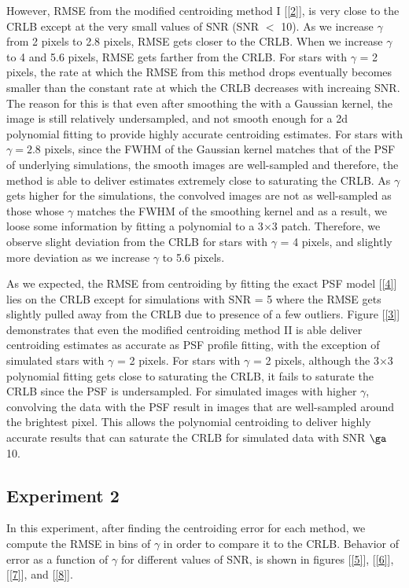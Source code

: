 \documentclass[12pt, preprint]{aastex}
\begin{document}
However, RMSE from the modified centroiding method I [\ref{2}],
is very close to the CRLB except at the very small values of SNR (SNR $<$ 10).
As we increase $\gamma$ from 2 pixels to 2.8 pixels, RMSE gets closer
to the CRLB. When we increase $\gamma$ to
4 and 5.6 pixels, RMSE gets farther from the CRLB. For stars with $\gamma$ = 2 pixels, 
the rate at which the RMSE from this method drops
eventually becomes smaller than the constant rate at which the CRLB
decreases with increaing SNR. The reason for this is that even after smoothing
the with a Gaussian kernel, the image is still relatively undersampled, and not smooth enough
for a 2d polynomial fitting to provide highly accurate centroiding estimates.
For stars with $\gamma=2.8$ pixels, since the FWHM of the Gaussian kernel matches that 
of the PSF of underlying simulations, the smooth images are well-sampled and therefore, 
the method is able to deliver estimates extremely close to saturating the CRLB. As $\gamma$
gets higher for the simulations, the convolved images are not as well-sampled as those 
whose $\gamma$ matches the FWHM of the smoothing kernel and as a result, we loose
some information by fitting a polynomial to a 3$\times$3 patch. Therefore,
 we observe slight deviation from the CRLB for stars with $\gamma$ = 4 pixels, and 
slightly more deviation as we increase $\gamma$ to 5.6 pixels.   
 
As we expected, the RMSE from centroiding by fitting the exact PSF model [\ref{4}]
lies on the CRLB except for simulations with SNR = 5 where the RMSE gets slightly pulled away
from the CRLB due to presence of a few outliers. Figure [\ref{3}] demonstrates that even the modified centroiding
 method II is able deliver centroiding estimates as accurate as PSF profile fitting, with the exception
of simulated stars with $\gamma$ = 2 pixels. For stars with $\gamma$ = 2 pixels, although the 3$\times$3 polynomial
fitting gets close to saturating the CRLB, it fails to saturate the CRLB since the PSF is undersampled. For simulated images with higher $\gamma$, convolving the
data with the PSF result in images that are well-sampled around the brightest pixel. This allows the 
polynomial centroiding to deliver highly accurate results that can saturate the CRLB for simulated
data with SNR $\ga$ 10.      


\subsection{Experiment 2}

In this experiment, after finding the centroiding error for each method, we
compute the RMSE in bins of $\gamma$ in order to compare it to the CRLB. 
Behavior of error as a function of $\gamma$ for different values of SNR,
is shown in figures [\ref{5}], [\ref{6}], [\ref{7}], and [\ref{8}]. 
 
\end{document}
